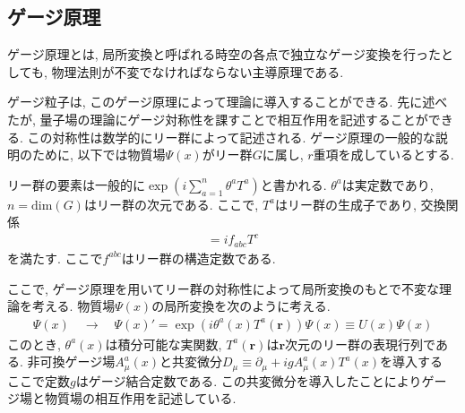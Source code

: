 \documentclass[uplatex,dvipdfmx,a4paper,titlepage]{jsbook}
\theoremstyle{plain}
\theoremstyle{definition}
\begin{document}
\subsection{ゲージ原理}
ゲージ原理とは, 局所変換と呼ばれる時空の各点で独立なゲージ変換を行ったとしても, 物理法則が不変でなければならない主導原理である.

ゲージ粒子は, このゲージ原理によって理論に導入することができる.
先に述べたが, 量子場の理論にゲージ対称性を課すことで相互作用を記述することができる.
この対称性は数学的にリー群によって記述される.
ゲージ原理の一般的な説明のために, 以下では物質場$\Psi(x)$がリー群$G$に属し, $r$重項を成しているとする.

リー群の要素は一般的に$\exp\left(i\sum_{a=1}^n \theta^a T^a\right)$と書かれる.
$\theta^a$は実定数であり, $n=\mathrm{dim}(G)$はリー群の次元である.
ここで, $T^a$はリー群の生成子であり, 交換関係
\begin{align}
  [T^a, T^b] = if_{abc}T^c \label{gauge-1}
\end{align}
を満たす.
ここで$f^{abc}$はリー群の構造定数である.

ここで, ゲージ原理を用いてリー群の対称性によって局所変換のもとで不変な理論を考える.
物質場$\Psi(x)$の局所変換を次のように考える.
\begin{align}
  \Psi(x)\quad\rightarrow\quad\Psi(x)' = \exp\left(i\theta^a(x)T^a(\bm{r})\right)\Psi(x) \equiv U(x)\Psi(x) \label{gauge-2}
\end{align}
このとき, $\theta^a(x)$は積分可能な実関数, $T^a(\bm{r})$は$\bm{r}$次元のリー群の表現行列である.
非可換ゲージ場$A^a_\mu(x)$と共変微分$D_\mu\equiv\partial_\mu+ig A^a_\mu(x)T^a(x)$を導入する
ここで定数$g$はゲージ結合定数である.
この共変微分を導入したことによりゲージ場と物質場の相互作用を記述している.
\end{document}
